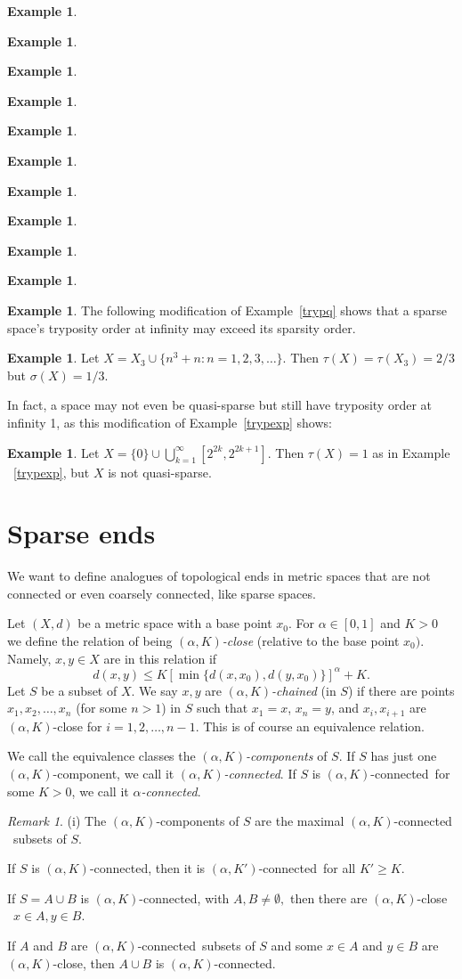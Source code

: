 \documentclass[12pt]{amsart}
\theoremstyle{definition}
\newtheorem{example}[theorem]{Example}
\theoremstyle{remark}
\newtheorem{remark}[theorem]{Remark}
\numberwithin{equation}{section}
\newcommand{\ak}{$(\alpha,K)$}
\newcommand{\akcomp}{$(\alpha,K)$-component}
\newcommand{\akconn}{$(\alpha,K)$-connected}
\newcommand{\akpconn}{$(\alpha,K')$-connected}
\newcommand{\aconn}{$\alpha$-connected}
\begin{document}
\begin{example}
\begin{example}
\begin{example}
\begin{example}
\begin{example}
\begin{example}
\begin{example}
\begin{example}
\begin{example}
\begin{example}
\begin{example}
The following modification of Example~\ref{trypq} shows that a sparse
space's tryposity order at infinity may exceed its sparsity order.

\begin{example}
Let $X = X_3 \cup \{n^3 + n : n=1,2,3,\dots\}.$
Then $\tau(X) = \tau(X_3) = 2/3$ but $\sigma(X) = 1/3.$
\end{example}

In fact, a space may not even be quasi-sparse but still have tryposity
order at infinity 1, as this modification of Example~\ref{trypexp}
shows:

\begin{example}
Let $X=\{0\} \cup \bigcup_{k=1}^\infty [2^{2k}, 2^{2k+1}].$ Then
$\tau(X) =1$ as in Example ~\ref{trypexp}, but $X$ is not
quasi-sparse.
\end{example}


\section{Sparse ends}\label{ends}

We want to define analogues of topological ends in metric spaces that
are not connected or even coarsely connected, like sparse spaces.

Let $(X,d)$ be a metric space with a base point $x_0$. For
$\alpha\in[0,1]$ and $K>0$ we define the relation of being
\emph{$(\alpha,K)$-close} (relative to the base point $x_0)$. Namely,
$x,y\in X$ are in this relation if
\begin{equation*}
d(x,y)\le K[\min\{d(x,x_0),d(y,x_0)\}]^\alpha + K.
\end{equation*}
Let $S$ be a subset of $X.$ We say $x,y$ are
\emph{$(\alpha,K)$-chained} (in $S$) if there are points
$x_1,x_2,\dots,x_n$ (for some $n>1$) in $S$ such that $x_1=x$,
$x_n=y$, and $x_i,x_{i+1}$ are $(\alpha,K)$-close for
$i=1,2,\dots,{n-1}$. This is of course an equivalence relation.

We call the equivalence classes the \emph{$(\alpha,K)$-components} of
$S$. If $S$ has just one \akcomp, we call it \emph{\akconn}. If $S$ is
\akconn \ for some $K>0$, we call it \emph{\aconn}.

\begin{remark} (i) The \akcomp s of $S$ are the maximal \akconn
  \ subsets of $S$.
\item[(ii)] If $S$ is \akconn, then it is \akpconn \ for all $K' \geq K.$
\item[(iii)] If $S=A \cup B$ is \akconn, with $A,B\neq \emptyset,$
  then there are \ak-close \ $x\in A, y\in B.$
\item[(iv)] If $A$ and $B$ are \akconn \ subsets of $S$ and some
  $x\in A$ and $y\in B$ are \ak-close, then $A\cup B$ is \akconn.
\end{remark}


\end{example}
\end{example}
\end{example}
\end{example}
\end{example}
\end{example}
\end{example}
\end{example}
\end{example}
\end{example}
\end{example}
\end{document}
